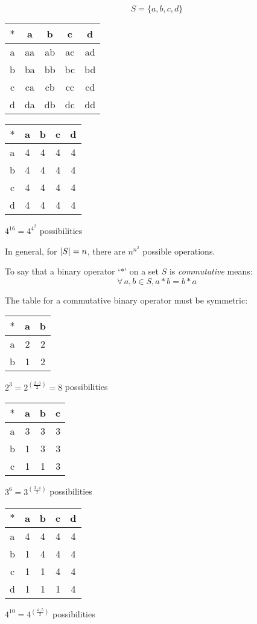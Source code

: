 \documentclass[letterpaper,12pt,fleqn]{article}
\begin{document}
\[S=\{a,b,c,d\}\]
\begin{tabular}{c|cccc}
  $*$ & a & b & c & d \\
  \hline
  a & aa & ab & ac & ad \\
  b & ba & bb & bc & bd \\
  c & ca & cb & cc & cd \\
  d & da & db & dc & dd \\
\end{tabular}\hspace{0.25in}
\begin{tabular}{c|cccc}
  $*$ & a & b & c & d \\
  \hline
  a & 4 & 4 & 4 & 4 \\
  b & 4 & 4 & 4 & 4 \\
  c & 4 & 4 & 4 & 4 \\
  d & 4 & 4 & 4 & 4 \\
\end{tabular}\hspace{0.25in}
$4^{16}=4^{4^2}$ possibilities

\bigskip
  
In general, for $\lvert S\rvert=n$, there are $n^{n^2}$ possible operations.
\newpage
\begin{definition}
  To say that a binary operator `$*$' on a set $S$ is \emph{commutative} means:
  \[\forall\,a,b\in S,a*b=b*a\]
\end{definition}

The table for a commutative binary operator must be symmetric:

\begin{tabular}{c|cc}
  $*$ & a & b \\
  \hline
  a & 2 & 2 \\
  b & 1 & 2 \\
\end{tabular}\hspace{0.25in}
$2^3=2^{\left(\frac{2\cdot3}{2}\right)}=8$ possibilities

\begin{tabular}{c|ccc}
  $*$ & a & b & c\\
  \hline
  a & 3 & 3 & 3 \\
  b & 1 & 3 & 3 \\
  c & 1 & 1 & 3 \\
\end{tabular}\hspace{0.25in}
$3^6=3^{\left(\frac{3\cdot4}{2}\right)}$ possibilities

\begin{tabular}{c|cccc}
  $*$ & a & b & c & d \\
  \hline
  a & 4 & 4 & 4 & 4 \\
  b & 1 & 4 & 4 & 4 \\
  c & 1 & 1 & 4 & 4 \\
  d & 1 & 1 & 1 & 4 \\
\end{tabular}\hspace{0.25in}
$4^{10}=4^{\left(\frac{4\cdot5}{2}\right)}$ possibilities
\end{document}
